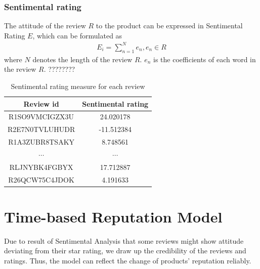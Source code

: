 \documentclass[12pt]{article}%
\begin{document}
\subsubsection{Sentimental rating}
The attitude of the review $R$ to the product can be expressed in Sentimental Rating $E$, which can be formulated as
\begin{gather}
 E_{i}=\sum_{n=1} ^{N}e_{n}, e_{n}\in R
\end{gather}
where $N$ denotes the length of the review $R$. $e_{n}$ is the coefficients of each word in the review $R$. ????????


\begin{table}[H]
	\centering
	\caption{Sentimental rating measure for each review}	
	\begin{tabular}{cc}
		\toprule[1.5pt]
		\multicolumn{1}{m{4cm}}{\centering Review id} & \multicolumn{1}{m{5cm}}{\centering Sentimental rating} \\
		\midrule[1pt]
		R1SO9VMCIGZX3U     	 & 24.020178\\
		R2E7N0TVLUHUDR     & -11.512384 \\
		R1A3ZUBR8TSAKY          &8.748561\\
		$\cdots$     &	$\cdots$ \\
		RLJNYBK4FGBYX          &17.712887\\
		R26QCW75C4JDOK          &4.191633\\
		\bottomrule[1.5pt]
	\end{tabular}\label{Rating}
\end{table}


\section{Time-based Reputation Model}
Due to result of Sentimental Analysis that some reviews might show attitude deviating from their star rating, we draw up the credibility of the reviews and ratings. Thus, the model can reflect the change of products' reputation reliably.
\end{document}
